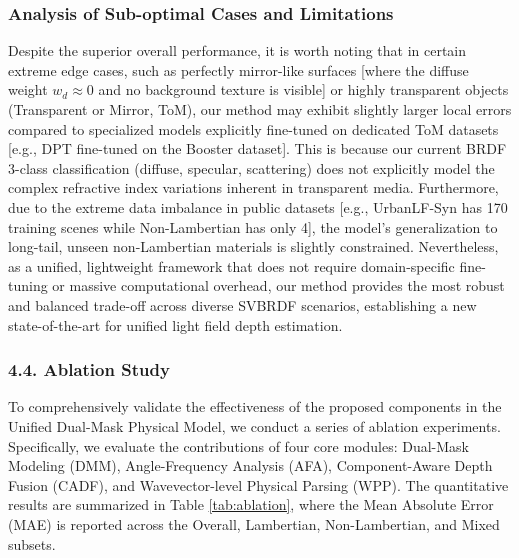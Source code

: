 \documentclass[lettersize,journal]{IEEEtran}
\begin{document}
\subsubsection{Analysis of Sub-optimal Cases and Limitations}
Despite the superior overall performance, it is worth noting that in certain extreme edge cases, such as perfectly mirror-like surfaces  [where the diffuse weight $w_d \approx 0$ and no background texture is visible] or highly transparent objects (Transparent or Mirror, ToM), our method may exhibit slightly larger local errors compared to specialized models explicitly fine-tuned on dedicated ToM datasets  [e.g., DPT fine-tuned on the Booster dataset]. This is because our current BRDF 3-class classification (diffuse, specular, scattering) does not explicitly model the complex refractive index variations inherent in transparent media. Furthermore, due to the extreme data imbalance in public datasets  [e.g., UrbanLF-Syn has 170 training scenes while Non-Lambertian has only 4], the model's generalization to long-tail, unseen non-Lambertian materials is slightly constrained. Nevertheless, as a unified, lightweight framework that does not require domain-specific fine-tuning or massive computational overhead, our method provides the most robust and balanced trade-off across diverse SVBRDF scenarios, establishing a new state-of-the-art for unified light field depth estimation.

\subsubsection{4.4. Ablation Study}

To comprehensively validate the effectiveness of the proposed components in the Unified Dual-Mask Physical Model, we conduct a series of ablation experiments. Specifically, we evaluate the contributions of four core modules: Dual-Mask Modeling (DMM), Angle-Frequency Analysis (AFA), Component-Aware Depth Fusion (CADF), and Wavevector-level Physical Parsing (WPP). The quantitative results are summarized in Table \ref{tab:ablation}, where the Mean Absolute Error (MAE) is reported across the Overall, Lambertian, Non-Lambertian, and Mixed subsets.
\end{document}
